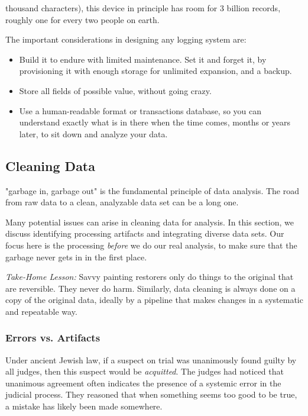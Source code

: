 \documentclass[10pt]{article}
\begin{document}
thousand characters), this device in principle has room for 3 billion records, roughly one for every two people on earth.

The important considerations in designing any logging system are:

\begin{itemize}
  \item Build it to endure with limited maintenance. Set it and forget it, by provisioning it with enough storage for unlimited expansion, and a backup.
  \item Store all fields of possible value, without going crazy.
  \item Use a human-readable format or transactions database, so you can understand exactly what is in there when the time comes, months or years later, to sit down and analyze your data.
\end{itemize}

\subsection{Cleaning Data}
"garbage in, garbage out" is the fundamental principle of data analysis. The road from raw data to a clean, analyzable data set can be a long one.

Many potential issues can arise in cleaning data for analysis. In this section, we discuss identifying processing artifacts and integrating diverse data sets. Our focus here is the processing \emph{before} we do our real analysis, to make sure that the garbage never gets in in the first place.

\emph{Take-Home Lesson:} Savvy painting restorers only do things to the original that are reversible. They never do harm. Similarly, data cleaning is always done on a copy of the original data, ideally by a pipeline that makes changes in a systematic and repeatable way.

\subsubsection{Errors vs. Artifacts}
Under ancient Jewish law, if a suspect on trial was unanimously found guilty by all judges, then this suspect would be \emph{acquitted}. The judges had noticed that unanimous agreement often indicates the presence of a systemic error in the judicial process. They reasoned that when something seems too good to be true, a mistake has likely been made somewhere.
\end{document}
